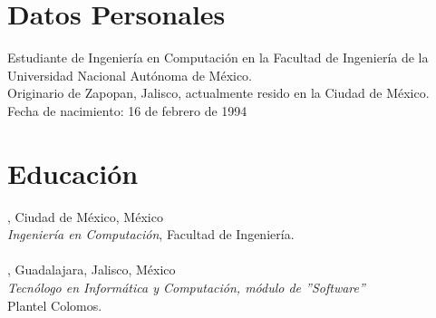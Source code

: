 \documentclass[mm]{simple_style}
\begin{document}
\begin{resume}

\section{Datos Personales}
Estudiante de Ingenier\'ia en Computaci\'on en la Facultad de Ingenier\'ia de la Universidad Nacional Aut\'onoma de M\'exico.\\
Originario de Zapopan, Jalisco, actualmente resido en la Ciudad de M\'exico.\\
Fecha de nacimiento: 16 de febrero de 1994\\
\sectionline

\section{Educaci\'on}
, Ciudad de M\'exico, M\'exico\\
{\sl Ingenier\'ia en Computaci\'on}, Facultad de Ingenier\'ia. \\
\\
, Guadalajara, Jalisco, M\'exico\\
{\sl Tecn\'ologo en Inform\'atica y Computaci\'on, m\'odulo de ''Software''}\\
Plantel Colomos. \\
\\
\sectionline


\end{resume}
\end{document}
